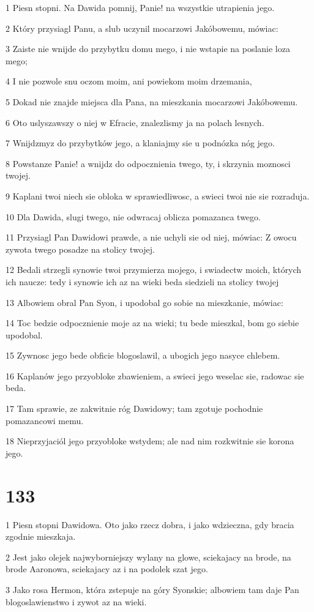 \par 1 Piesn stopni. Na Dawida pomnij, Panie! na wszystkie utrapienia jego.
\par 2 Który przysiagl Panu, a slub uczynil mocarzowi Jakóbowemu, mówiac:
\par 3 Zaiste nie wnijde do przybytku domu mego, i nie wstapie na poslanie loza mego;
\par 4 I nie pozwole snu oczom moim, ani powiekom moim drzemania,
\par 5 Dokad nie znajde miejsca dla Pana, na mieszkania mocarzowi Jakóbowemu.
\par 6 Oto uslyszawszy o niej w Efracie, znalezlismy ja na polach lesnych.
\par 7 Wnijdzmyz do przybytków jego, a klaniajmy sie u podnózka nóg jego.
\par 8 Powstanze Panie! a wnijdz do odpocznienia twego, ty, i skrzynia moznosci twojej.
\par 9 Kaplani twoi niech sie obloka w sprawiedliwosc, a swieci twoi nie sie rozraduja.
\par 10 Dla Dawida, slugi twego, nie odwracaj oblicza pomazanca twego.
\par 11 Przysiagl Pan Dawidowi prawde, a nie uchyli sie od niej, mówiac: Z owocu zywota twego posadze na stolicy twojej.
\par 12 Bedali strzegli synowie twoi przymierza mojego, i swiadectw moich, których ich naucze: tedy i synowie ich az na wieki beda siedzieli na stolicy twojej
\par 13 Albowiem obral Pan Syon, i upodobal go sobie na mieszkanie, mówiac:
\par 14 Toc bedzie odpocznienie moje az na wieki; tu bede mieszkal, bom go siebie upodobal.
\par 15 Zywnosc jego bede obficie blogoslawil, a ubogich jego nasyce chlebem.
\par 16 Kaplanów jego przyobloke zbawieniem, a swieci jego weselac sie, radowac sie beda.
\par 17 Tam sprawie, ze zakwitnie róg Dawidowy; tam zgotuje pochodnie pomazancowi memu.
\par 18 Nieprzyjaciól jego przyobloke wstydem; ale nad nim rozkwitnie sie korona jego.

\chapter{133}

\par 1 Piesn stopni Dawidowa. Oto jako rzecz dobra, i jako wdzieczna, gdy bracia zgodnie mieszkaja.
\par 2 Jest jako olejek najwyborniejszy wylany na glowe, sciekajacy na brode, na brode Aaronowa, sciekajacy az i na podolek szat jego.
\par 3 Jako rosa Hermon, która zstepuje na góry Syonskie; albowiem tam daje Pan blogoslawienstwo i zywot az na wieki.

